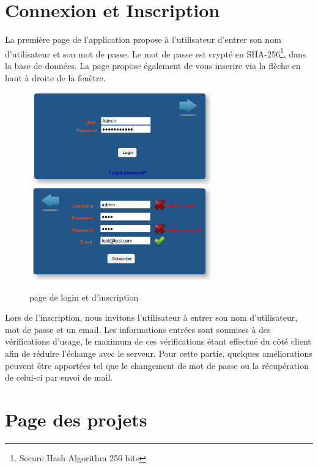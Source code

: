 \section{Connexion et Inscription}

La première page de l'application propose à l'utilisateur d'entrer son nom d'utilisateur et son mot de passe. Le mot de passe est crypté en SHA-256\footnote{Secure Hash Algorithm 256 bits}, dans la base de données. La page propose également de vous inscrire via la flèche en haut à droite de la fenêtre.

\begin{figure}[!h]
	\begin{center}
	\includegraphics[width=8cm,height=4cm]{login.png}	
	\includegraphics[width=8cm,height=4cm]{subscribe.png}
	\caption{page de login et d'inscription}
\end{center}
\end{figure}

Lors de l'inscription, nous invitons l'utilisateur à entrer son nom d'utilisateur, mot de passe et un email. Les informations entrées sont soumises à des vérifications d'usage, le maximum de ces vérifications étant effectué du côté client afin de réduire l'échange avec le serveur.
\newline
\indent
Pour cette partie, quelques améliorations peuvent être apportées tel que le changement de mot de passe ou la récupération de celui-ci par envoi de mail.

\section{Page des projets}

